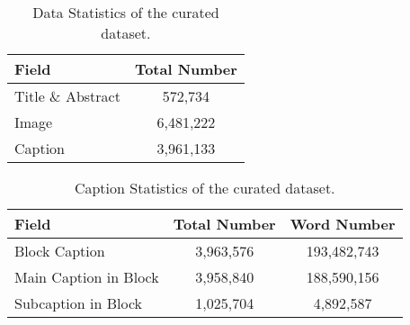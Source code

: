 \begin{table}[tbh!]
    \centering
    \begin{tabular}{l|c}
    \toprule
       Field  & Total Number \\
       \midrule
       Title \& Abstract & 572,734 \\ 
       Image & 6,481,222 \\ 
       Caption & 3,961,133 \\ 
       \bottomrule
    \end{tabular}
    \caption{Data Statistics of the curated dataset.}
    \label{tab:data_statistics}
\end{table}

\begin{table}[tbh!]
    \centering
    \begin{tabular}{l|cc}
    \toprule
       Field  & Total Number & Word Number \\
       \midrule
       Block Caption & 3,963,576 & 193,482,743 \\ 
       Main Caption in Block & 3,958,840 & 188,590,156 \\ 
       Subcaption in Block & 1,025,704 & 4,892,587 \\ 
       \bottomrule
    \end{tabular}
    \caption{Caption Statistics of the curated dataset.}
    \label{tab:caption_statistics}
\end{table}


